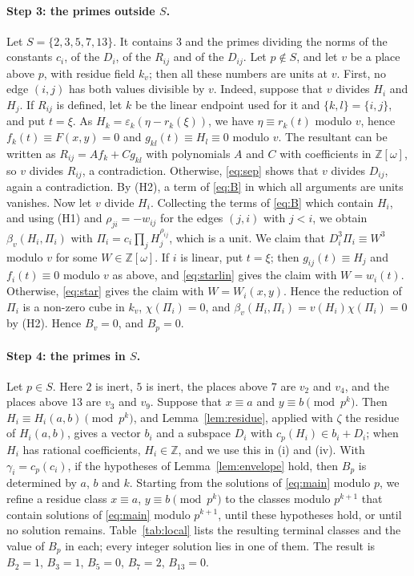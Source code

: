 \documentclass[11pt]{article}
\newcommand{\Z}{\mathbb{Z}}
\begin{document}
\paragraph{Step 3: the primes outside $S$.} Let $S=\{2,3,5,7,13\}$. It contains $3$ and the primes dividing the norms of the constants $c_i$, of the $D_i$, of the $R_{ij}$ and of the $D_{ij}$. Let $p\notin S$, and let $v$ be a place above $p$, with residue field $k_v$; then all these numbers are units at $v$. First, no edge $(i,j)$ has both values divisible by $v$. Indeed, suppose that $v$ divides $H_i$ and $H_j$. If $R_{ij}$ is defined, let $k$ be the linear endpoint used for it and $\{k,l\}=\{i,j\}$, and put $t=\xi$. As $H_k=\varepsilon_k(\eta-r_k(\xi))$, we have $\eta\equiv r_k(t)$ modulo $v$, hence $f_k(t)\equiv F(x,y)=0$ and $g_{kl}(t)\equiv H_l\equiv0$ modulo $v$. The resultant can be written as $R_{ij}=Af_k+Cg_{kl}$ with polynomials $A$ and $C$ with coefficients in $\Z[\omega]$, so $v$ divides $R_{ij}$, a contradiction. Otherwise, \eqref{eq:sep} shows that $v$ divides $D_{ij}$, again a contradiction. By (H2), a term of \eqref{eq:B} in which all arguments are units vanishes. Now let $v$ divide $H_i$. Collecting the terms of \eqref{eq:B} which contain $H_i$, and using (H1) and $\rho_{ji}=-w_{ij}$ for the edges $(j,i)$ with $j<i$, we obtain $\beta_v(H_i,\Pi_i)$ with $\Pi_i=c_i\prod_jH_j^{\rho_{ij}}$, which is a unit. We claim that $D_i^3\Pi_i\equiv W^3$ modulo $v$ for some $W\in\Z[\omega]$. If $i$ is linear, put $t=\xi$; then $g_{ij}(t)\equiv H_j$ and $f_i(t)\equiv0$ modulo $v$ as above, and \eqref{eq:starlin} gives the claim with $W=w_i(t)$. Otherwise, \eqref{eq:star} gives the claim with $W=W_i(x,y)$. Hence the reduction of $\Pi_i$ is a non-zero cube in $k_v$, $\chi(\Pi_i)=0$, and $\beta_v(H_i,\Pi_i)=v(H_i)\chi(\Pi_i)=0$ by (H2). Hence $B_v=0$, and $B_p=0$.

\paragraph{Step 4: the primes in $S$.} Let $p\in S$. Here $2$ is inert, $5$ is inert, the places above $7$ are $v_{2}$ and $v_{4}$, and the places above $13$ are $v_{3}$ and $v_{9}$. Suppose that $x\equiv a$ and $y\equiv b\pmod{p^k}$. Then $H_i\equiv H_i(a,b)\pmod{p^k}$, and Lemma~\ref{lem:residue}, applied with $\zeta$ the residue of $H_i(a,b)$, gives a vector $b_i$ and a subspace $D_i$ with $c_p(H_i)\in b_i+D_i$; when $H_i$ has rational coefficients, $H_i\in\Z$, and we use this in (i) and (iv). With $\gamma_i=c_p(c_i)$, if the hypotheses of Lemma~\ref{lem:envelope} hold, then $B_p$ is determined by $a$, $b$ and $k$. Starting from the solutions of \eqref{eq:main} modulo $p$, we refine a residue class $x\equiv a$, $y\equiv b\pmod{p^k}$ to the classes modulo $p^{k+1}$ that contain solutions of \eqref{eq:main} modulo $p^{k+1}$, until these hypotheses hold, or until no solution remains. Table~\ref{tab:local} lists the resulting terminal classes and the value of $B_p$ in each; every integer solution lies in one of them. The result is $B_{2}=1$, $B_{3}=1$, $B_{5}=0$, $B_{7}=2$, $B_{13}=0$.
\end{document}

